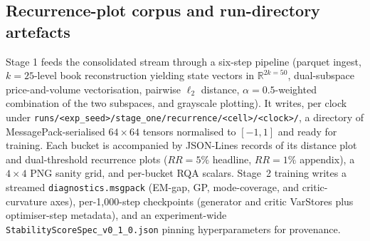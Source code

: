 \subsection*{Recurrence-plot corpus and run-directory artefacts}
Stage 1 feeds the consolidated stream through a six-step pipeline
(parquet ingest, $k=25$-level book reconstruction yielding state
vectors in $\mathbb{R}^{2k=50}$, dual-subspace price-and-volume
vectorisation, pairwise $\ell_2$ distance, $\alpha=0.5$-weighted
combination of the two subspaces, and grayscale plotting). It
writes, per clock under
\texttt{runs/<exp\_seed>/stage\_one/recurrence/<cell>/<clock>/}, a
directory of MessagePack-serialised $64 \times 64$ tensors
normalised to $[-1, 1]$ and ready for training. Each bucket is
accompanied by JSON-Lines records of its distance plot and
dual-threshold recurrence plots ($RR = 5\%$ headline,
$RR = 1\%$ appendix), a $4 \times 4$ PNG sanity grid, and per-bucket
RQA scalars. Stage~2 training writes a streamed
\texttt{diagnostics.msgpack} (EM-gap, GP, mode-coverage, and
critic-curvature axes), per-1{,}000-step checkpoints (generator and
critic VarStores plus optimiser-step metadata), and an
experiment-wide \texttt{StabilityScoreSpec\_v0\_1\_0.json} pinning
hyperparameters for provenance.

